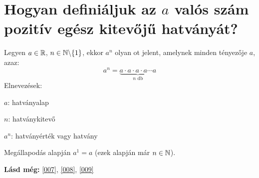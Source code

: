 
\section{Hogyan definiáljuk az \texorpdfstring{$a$}{a} valós szám pozitív egész
kitevőjű hatványát?}
\label{006}

\begin{defin}[Hatvány]
\label{def:power}
Legyen $a \in \mathbb{R}$, $n \in \mathbb{N} \backslash \{1\}$, ekkor $a^n$ olyan
ot jelent, amelynek minden tényezője $a$, azaz:
\[
a^n = \underbrace{a \cdot a \cdot a \cdot a \cdots{ } a}_{n \text{ db}}
\]
Elnevezések:

$a$: hatványalap

$n$: hatványkitevő

$a^n$: hatványérték vagy hatvány

Megállapodás alapján $a^1 = a$ (ezek alapján már $n \in \mathbb{N}$).
\end{defin}

\textbf{Lásd még:} \ref{007}, \ref{008}, \ref{009}
